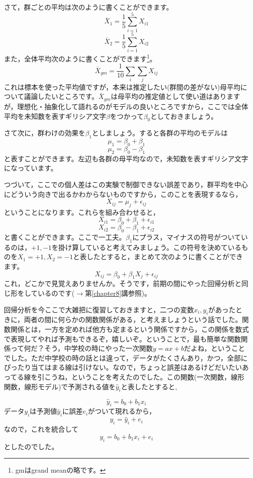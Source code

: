 \documentclass{ltjsarticle}
\begin{document}
さて，群ごとの平均は次のように書くことができます。
$$ \bar{X}_1 =\frac{1}{5} \sum_{i=1}^5 X_{i1} $$
$$ \bar{X}_2 =\frac{1}{5} \sum_{i=1}^5 X_{i2} $$
また，全体平均次のように書くことができます\footnote{gmはgrand meanの略です。}。
$$ \bar{X}_{gm} = \frac{1}{10} \sum_{i} \sum_{j} X_{ij} $$
これは標本を使った平均値ですが，本来は推定したい(群間の差がない)母平均について議論したいところです。$\bar{X}_{gm}$は母平均の推定値として使い道はありますが，理想化・抽象化して語れるのがモデルの良いところですから，ここでは全体平均を未知数を表すギリシア文字$\beta$をつかって$\beta_0$としておきましょう。

さて次に，群わけの効果を$\beta_1$としましょう。すると各群の平均のモデルは
$$ \mu_1= \beta_0 + \beta_1 $$
$$ \mu_2 = \beta_0  -\beta_1 $$
と表すことができます。左辺も各群の母平均なので，未知数を表すギリシア文字になっています。

つづいて，ここでの個人差はこの実験で制御できない誤差であり，群平均を中心にどういう向きで出るかわからないものですから，このことを表現するなら，
$$ X_{ij} = \mu_j + \epsilon_{ij} $$
ということになります。これらを組み合わせると，
$$ X_{i1} = \beta_0 + \beta_1 + \epsilon_{i1} $$
$$ X_{i2} = \beta_0 - \beta_1 + \epsilon_{i2} $$
と書くことができます。ここで一工夫。$\beta_1$にプラス，マイナスの符号がついているのは，$+1,-1$を掛け算していると考えてみましょう。この符号を決めているものを$X_{1}=+1,X_{2}=-1$と表したとすると，まとめて次のように書くことができます。
\begin{equation}
    \label{eq::21_1}
     X_{ij} = \beta_0 +  \beta_1 X_{j} + \epsilon_{ij} 
\end{equation}
これ，どこかで見覚えありませんか。そうです，前期の間にやった回帰分析と同じ形をしているのです($\to$第\ref{chapter8}講参照)。

回帰分析を今ここで大雑把に復習しておきますと，二つの変数$x_i,y_i$があったときに，両者の間に何らかの関数関係がある，と考えましょうという話でした。関数関係とは，一方を定めれば他方も定まるという関係ですから，この関係を数式で表現してやれば予測もできるぞ，嬉しいぞ。ということで，最も簡単な関数関係って何だ？そう，中学校の時にやった一次関数$y=ax+b$だよね，ということでした。ただ中学校の時の話とは違って，データがたくさんあり，かつ，全部にぴったり当てはまる線は引けない。なので，ちょっと誤差はあるけどだいたいあってる線を引こうね，ということを考えたのでした。この関数(一次関数，線形関数，線形モデル)で予測される値を$\hat{y}_i$と表したとすると,

$$ \hat{y}_i = b_0 + b_1x_i $$
データ$y_i$は予測値$\hat{y}_i$に誤差$e_i$がついて現れるから，
$$ y_i = \hat{y}_i + e_i $$
なので，これを統合して
$$ y_i = b_0 + b_1 x_i + e_i $$
としたのでした。
\end{document}
